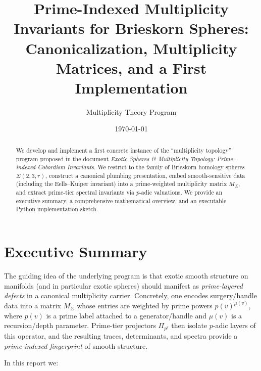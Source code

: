 \documentclass[11pt]{article}
\title{Prime-Indexed Multiplicity Invariants for Brieskorn Spheres:\\
Canonicalization, Multiplicity Matrices, and a First Implementation}
\author{Multiplicity Theory Program}
\date{\today}
\begin{document}
\maketitle

\begin{abstract}
We develop and implement a first concrete instance of the ``multiplicity topology'' program proposed in the document \emph{Exotic Spheres \& Multiplicity Topology: Prime-indexed Cobordism Invariants}. We restrict to the family of Brieskorn homology spheres $\Sigma(2,3,r)$, construct a canonical plumbing presentation, embed smooth-sensitive data (including the Eells--Kuiper invariant) into a prime-weighted multiplicity matrix $M_\Sigma$, and extract prime-tier spectral invariants via $p$-adic valuations. We provide an executive summary, a comprehensive mathematical overview, and an executable Python implementation sketch.
\end{abstract}

\tableofcontents

\section{Executive Summary}

The guiding idea of the underlying program is that exotic smooth structure on manifolds (and in particular exotic spheres) should manifest as \emph{prime-layered defects} in a canonical multiplicity carrier.\cite{internal-mult} Concretely, one encodes surgery/handle data into a matrix $M_\Sigma$ whose entries are weighted by prime powers $p(v)^{\mu(v)}$, where $p(v)$ is a prime label attached to a generator/handle and $\mu(v)$ is a recursion/depth parameter.\cite{exotic-mult} Prime-tier projectors $\Pi_{p^r}$ then isolate $p$-adic layers of this operator, and the resulting traces, determinants, and spectra provide a \emph{prime-indexed fingerprint} of smooth structure.\cite{exotic-mult}

In this report we:
\end{document}
